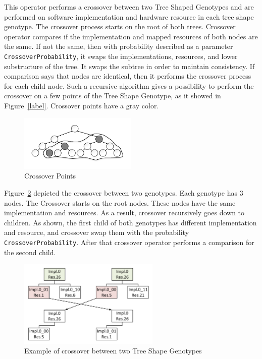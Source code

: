This operator performs a crossover between two Tree Shaped Genotypes and are performed on software implementation and hardware resource in each tree shape genotype. 
The crossover process starts on the root of both trees. Crossover operator compares if the implementation and mapped resources of both nodes are the same. If not the same, then with probability described as a parameter \texttt{CrossoverProbability}, it swaps the implementations, resources, and lower substructure of the tree. It swaps the subtree in order to maintain consistency. If comparison says that nodes are identical, then it performs the crossover process for each child node. Such a recursive algorithm gives a possibility to perform the crossover on a few points of the Tree Shape Genotype, as it showed in Figure~\ref{label}. Crossover points have a gray color.

\begin{figure}
	\centering
	\includegraphics[width=0.5\textwidth]{images/CrossoverPoints.pdf}
	\caption[Crossover Points]{Crossover Points}
	\label{fig:CrossoverPoints}
\end{figure}

Figure~\ref{fig:GeneticSolverCrossover} depicted the crossover between two genotypes. Each genotype has 3 nodes. The Crossover starts on the root nodes. These nodes have the same implementation and resources. As a result, crossover recursively goes down to children. As shown, the first child of both genotypes has different implementation and resource, and crossover swap them with the probability \texttt{CrossoverProbability}. After that crossover operator performs a comparison for the second child.


\begin{figure}
	\centering
	\includegraphics[width=0.6\textwidth]{images/GeneticSolverCrossover.pdf}
	\caption[Crossover in Tree Shape Genotype]{Example of crossover between two Tree Shape Genotypes}
	\label{fig:GeneticSolverCrossover}
\end{figure}



